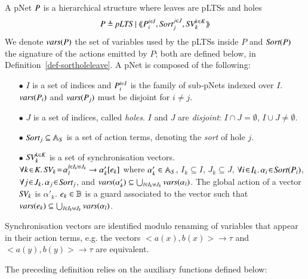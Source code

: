 \documentclass{elsarticle}
\begin{document}
\begin{definition}[pNets]\label{def-pnets}
A pNet $P$ is a hierarchical structure where leaves are pLTSs and holes 
\[
\pNet\triangleq \pLTS~|~\mylangle \pNet_i^{i\in I}, \Sort_j^{j\in J}, \symb{SV}_k^{k\in 
K}\myrangle\]
 We denote $\vars(P)$ the set of variables used by the pLTSs inside $P$ and $\Sort(P)$  the signature of the actions emitted by $P$; both are defined below, in Definition~\ref{def-sortholeleave}. A pNet is composed of the following:
\begin{itemize}
\item[$\bullet$] $I$ is a set of indices and $P_i^{i\in I}$ is the family of sub-pNets indexed over $I$. $\vars(P_i)$ and $\vars(P_j)$ must be disjoint for $i\neq j$.

\item[$\bullet$] $J$ is a set of indices, called \emph{holes}.
$I$ and $J$ are \emph{disjoint}: $I\!\cap\! J=\emptyset$,  $I\!\cup\! J\neq\emptyset$.
\item[$\bullet$] $\Sort_j \subseteq \AlgAS$  is a set of action terms, denoting the 
\emph{sort} of
hole $j$.

\item[$\bullet$] $\symb{SV}_k^{k\in K}$ is a set of
  synchronisation vectors.\\ $\forall k\!\in\! K.\,
  \symb{SV}_k\!=\!\SV{\alpha_{l}^{l\in I_k \uplus J_k}}{\alpha'_k}{e_k}$ where
  $\alpha'_k\in \mathbb{A}_S$, $I_k\subseteq I$, $J_k\subseteq J$,
  $\forall i\!\in\!
  I_k.\,\alpha_{i}\!\in\!\Sort(\pNet_i)$,  $\forall j\!\in\!
  J_k.\,\alpha_{j}\!\in\!\Sort_j$, and $\vars(\alpha'_k)\subseteq \bigcup_{l\in I_k\uplus 
  J_k}{\vars({\alpha_l})}$. The global action of a vector $\symb{SV}_k$ is
$\alpha'_k$. $e_k \in \mathbb{B}$ is a guard associated to the vector such that
$\vars(e_k)\subseteq \bigcup_{l\in I_k\uplus J_k}{\vars({\alpha_l})}$.
\end{itemize}
Synchronisation vectors are identified modulo renaming of variables that appear in their 
action terms, e.g. the vectors $<a(x),b(x)>\to\tau$ and $<a(y),b(y)>\to\tau$ are equivalent.
\end{definition}

The preceding definition relies on the auxiliary functions defined below:
\end{document}
